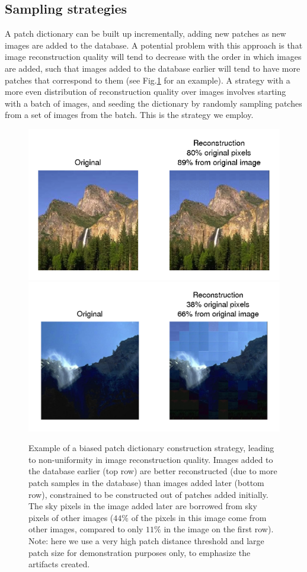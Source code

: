 \subsection{Sampling strategies}
\label{sec:sample}

A patch dictionary can be built up incrementally, adding new patches as new images are added to the database. A potential problem with this approach is that image reconstruction quality will tend to decrease with the order in which images are added, such that images added to the database earlier will tend to have more patches that correspond to them (see Fig.\ref{fig:sampStrategy} for an example). A strategy with a more even distribution of reconstruction quality over images involves starting with a batch of images, and seeding the dictionary by randomly sampling patches from a set of images from the batch. This is the strategy we employ.

 \begin{figure}
\includegraphics[width=0.9\linewidth]{Figures/009.png}
\includegraphics[width=0.9\linewidth]{Figures/014.png}
\caption{Example of a biased patch dictionary construction strategy, leading to non-uniformity in image reconstruction quality. Images added to the database earlier (top row) are better reconstructed (due to more patch samples in the database) than images added later (bottom row), constrained to be constructed out of patches added initially. The sky pixels in the image added later are borrowed from sky pixels of other images ($44\%$ of the pixels in this image come from other images, compared to only $11\%$ in the image on the first row). Note: here we use a very high patch distance threshold and large patch size for demonstration purposes only, to emphasize the artifacts created.}
\label{fig:sampStrategy}
\end{figure}


